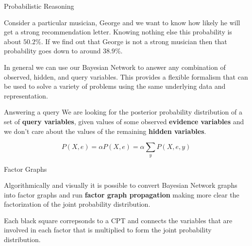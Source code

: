 \documentclass[12pt]{beamer}
\begin{document}
\begin{frame}{Probabilistic Reasoning}

Consider a particular musician, George and we want to know how likely
he will get a strong recommendation letter. Knowing nothing else this
probability is about $50.2\%$. If we find out that George is not a
strong musician then that probability goes down to around $38.9\%$.

In general we can use our Bayesian Network to answer any combination
of observed, hidden, and query variables. This provides a flexible
formalism that can be used to solve a variety of problems using the
same underlying data and representation. 

\end{frame}

\begin{frame}{Answering a query}
We are looking for the posterior probability distribution of a set of
{\bf query variables}, given values of some observed {\bf evidence
  variables} and we don't care about the values of the remaining {\bf
  hidden variables}.
  
  \[
  P(X,e) = \alpha P(X,e) = \alpha \sum_{y}P(X,e,y)
  \]
  \end{frame} 



\begin{frame}{Factor Graphs}

  Algorithmically and visually it is possible to convert Bayesian Network
  graphs into factor graphs and run {\bf factor graph propagation} making
  more clear the factorization of the joint probability distribution.

  Each black square correpsonds to a CPT and connects the variables
  that are involved in each factor that is multiplied to form
  the joint probability distribution. 

  
\hspace{4cm} 
  

  
\end{frame}
\end{document}
